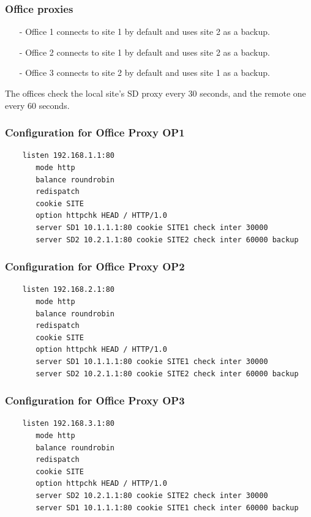 \subsubsection{Office proxies}

\begin{itemize}
\item[-] Office 1 connects to site 1 by default and uses site 2 as a backup.
\item[-] Office 2 connects to site 1 by default and uses site 2 as a backup.
\item[-] Office 3 connects to site 2 by default and uses site 1 as a backup.
\end{itemize}

The offices check the local site's SD proxy every 30 seconds, and the
remote one every 60 seconds.

\subsubsection{Configuration for Office Proxy OP1}

\begin{verbatim}
    listen 192.168.1.1:80
       mode http
       balance roundrobin
       redispatch
       cookie SITE
       option httpchk HEAD / HTTP/1.0
       server SD1 10.1.1.1:80 cookie SITE1 check inter 30000
       server SD2 10.2.1.1:80 cookie SITE2 check inter 60000 backup
\end{verbatim}

\subsubsection{Configuration for Office Proxy OP2}

\begin{verbatim}
    listen 192.168.2.1:80
       mode http
       balance roundrobin
       redispatch
       cookie SITE
       option httpchk HEAD / HTTP/1.0
       server SD1 10.1.1.1:80 cookie SITE1 check inter 30000
       server SD2 10.2.1.1:80 cookie SITE2 check inter 60000 backup
\end{verbatim}

\subsubsection{Configuration for Office Proxy OP3}

\begin{verbatim}
    listen 192.168.3.1:80
       mode http
       balance roundrobin
       redispatch
       cookie SITE
       option httpchk HEAD / HTTP/1.0
       server SD2 10.2.1.1:80 cookie SITE2 check inter 30000
       server SD1 10.1.1.1:80 cookie SITE1 check inter 60000 backup
\end{verbatim}

